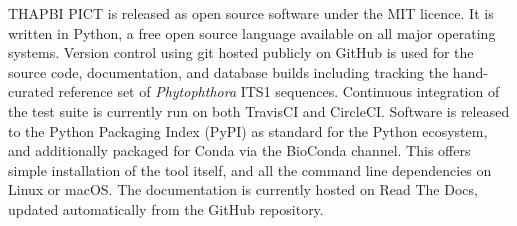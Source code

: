 \documentclass[10pt,oneside]{article}
\begin{document}
THAPBI PICT is released as open source software under the MIT licence. It is written in Python, a free open source language available on all major operating systems. Version control using git hosted publicly on GitHub is used for the source code, documentation, and database builds including tracking the hand-curated reference set of \textit{Phytophthora} ITS1 sequences. Continuous integration of the test suite is currently run on both TravisCI and CircleCI. Software is released to the Python Packaging Index (PyPI) as standard for the Python ecosystem, and additionally packaged for Conda via the BioConda channel. This offers simple installation of the tool itself, and all the command line dependencies on Linux or macOS. The documentation is currently hosted on Read The Docs, updated automatically from the GitHub repository.
\end{document}
